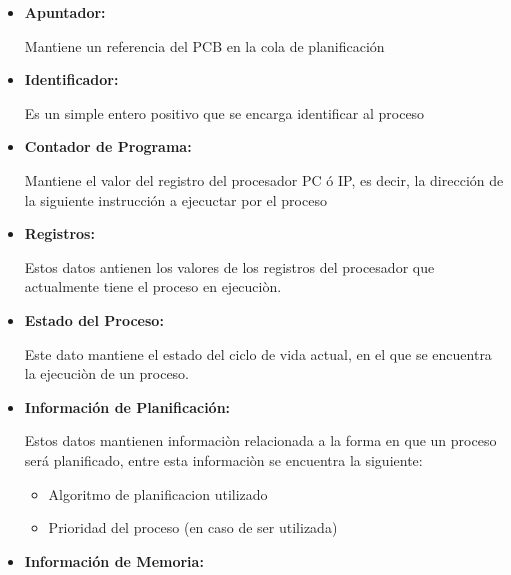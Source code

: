 \documentclass[12pt, fleqn]{report}                             %
\begin{document}
            \begin{itemize}
                \item
                    \textbf{Apuntador:}

                    Mantiene un referencia del PCB en la cola de planificación

                \item
                    \textbf{Identificador:}

                    Es un simple entero positivo que se encarga identificar al proceso

                \item
                    \textbf{Contador de Programa:}

                    Mantiene el valor del registro del procesador PC ó IP, es decir, la dirección
                    de la siguiente instrucción a ejecuctar por el proceso

                \item
                    \textbf{Registros:}

                    Estos datos antienen los valores de los registros del procesador que actualmente
                    tiene el proceso en ejecuciòn.
                \item
                    \textbf{Estado del Proceso:}

                    Este dato mantiene el estado del ciclo de vida actual, en el que se encuentra
                    la ejecuciòn de un proceso.

                \item
                    \textbf{Información de Planificación:}

                        Estos datos mantienen informaciòn relacionada a la forma en que un proceso será
                        planificado, entre esta informaciòn se encuentra la siguiente: 

                            \begin{itemize}
                                \item Algoritmo de planificacion utilizado 
                                \item Prioridad del proceso (en caso de ser utilizada)
                            \end{itemize}

                \item
                    \textbf{Información de Memoria:}


\end{itemize}
\end{document}
